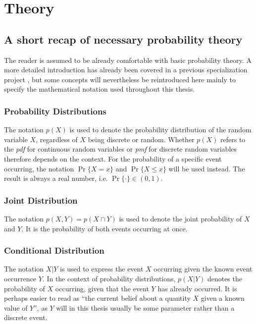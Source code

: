 \chapter{Theory}\label{chap:theory}

\section{A short recap of necessary probability theory}
The reader is assumed to be already comfortable with basic probability theory. A more detailed introduction has already been covered in a previous specialization project \cite{mellbye}, but some concepts will nevertheless be reintroduced here mainly to specify the mathematical notation used throughout this thesis. 

\subsection{Probability Distributions}
The notation $p(X)$ is used to denote the probability distribution of the random variable $X$, regardless of $X$ being discrete or random. Whether $p(X)$ refers to the \textit{\acrfull{pdf}} for continuous random variables or \textit{\acrfull{pmf}} for discrete random variables therefore depends on the context. For the probability of a specific event occurring, the notation $\Pr\{X=x\}$ and $\Pr\{X \leq x\}$ will be used instead. The result is always a real number, i.e. $\Pr\{\cdot\} \in (0, 1)$. 

\subsection{Joint Distribution}
The notation $p(X, Y) = p(X \cap Y)$ is used to denote the joint probability of $X$ and $Y$. It is the probability of both events occurring at once.

\subsection{Conditional Distribution}
The notation $X | Y$ is used to express the event $X$ occurring given the known event occurrence $Y$. In the context of probability distributions, $p(X | Y)$ denotes the probability of $X$ occurring, given that the event $Y$ has already occurred. It is perhaps easier to read as ``the current belief about a quantity $X$ given a known value of $Y$'', as $Y$ will in this thesis usually be some parameter rather than a discrete event. 

